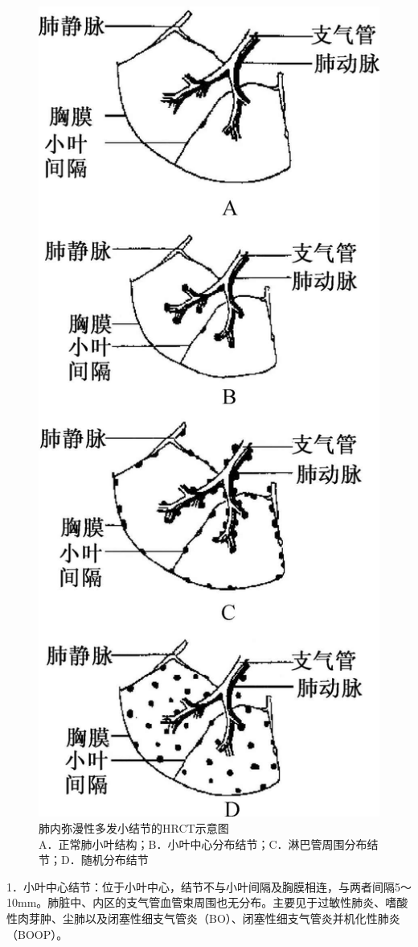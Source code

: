 \begin{figure}[!htbp]
 \centering
 \includegraphics[width=.7\textwidth,height=\textheight,keepaspectratio]{./images/Image00186.jpg}
 \captionsetup{justification=centering}
 \caption{肺内弥漫性多发小结节的HRCT示意图\\{\small A．正常肺小叶结构；B．小叶中心分布结节；C．淋巴管周围分布结节；D．随机分布结节}}
 \label{fig9-3}
  \end{figure} 

1．小叶中心结节：位于小叶中心，结节不与小叶间隔及胸膜相连，与两者间隔5～10mm。肺脏中、内区的支气管血管束周围也无分布。主要见于过敏性肺炎、嗜酸性肉芽肿、尘肺以及闭塞性细支气管炎（BO）、闭塞性细支气管炎并机化性肺炎（BOOP）。

